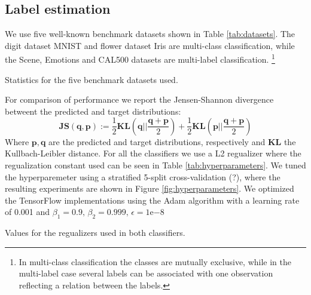 \subsection{Label estimation}
We use five well-known benchmark datasets shown in Table \ref{tab:datasets}.  The digit dataset MNIST and flower dataset Iris are multi-class classification, while the Scene, Emotions and CAL500 datasets are multi-label classification. \footnote{In multi-class classification the classes are mutually exclusive, while in the multi-label case several labels can be associated with one observation reflecting a relation between the labels.} 
\begin{table}[H]
\centering

\caption{Statistics for the five benchmark datasets used.}
\label{tab:datasets}
\end{table}
For comparison of performance we report the Jensen-Shannon divergence betweent the predicted and target distributions:
\begin{equation}
\mathbf{JS(q,p)}:=\frac{1}{2}\mathbf{KL}(\mathbf{q}||\frac{\mathbf{q}+\mathbf{p}}{2})+\frac{1}{2}\mathbf{KL}(\mathbf{p}||\frac{\mathbf{q}+\mathbf{p}}{2})
\end{equation}
Where $\mathbf{p}, \mathbf{q}$ are the predicted and target distributions, respectively and $\mathbf{KL}$ the Kullbach-Leibler distance. For all the classifiers we use a L2 regualizer where the regualization constant used can be seen in Table \ref{tab:hyperparameters}. We tuned the hyperparemeter using a stratified 5-split cross-validation (?), where the resulting experiments are shown in Figure \ref{fig:hyperparameters}. We optimized the TensorFlow implementations using the Adam algorithm with a learning rate of 0.001 and $\beta_1=0.9, \, \beta_2 = 0.999, \, \epsilon = 1\mathrm{e}{-8}$ 
\begin{table}[H]
\centering

\caption{Values for the regualizers used in both classifiers.}
\label{tab:hyperparameters}
\end{table}
